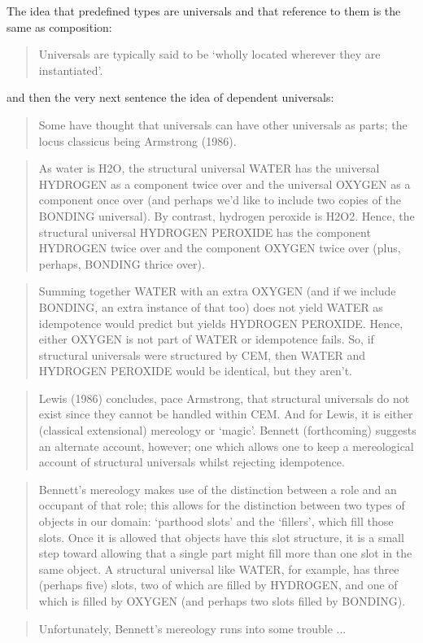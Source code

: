 \documentclass[10pt,a4paper]{scrartcl}
\begin{document}
The idea that predefined types are universals and that reference to them is the same as composition:
\begin{quote}
Universals are typically said to be ‘wholly located wherever they are instantiated’.
\end{quote}
and then the very next sentence the idea of dependent universals:
\begin{quote}
Some have thought that universals can have other universals as parts; the locus classicus being
Armstrong (1986).
\end{quote}


\begin{quote}
As water is H2O, the structural universal WATER has the universal HYDROGEN as a
component twice over and the universal OXYGEN as a component once over (and perhaps
we’d like to include two copies of the BONDING universal). By contrast, hydrogen peroxide
is H2O2. Hence, the structural universal HYDROGEN PEROXIDE has the component
HYDROGEN twice over and the component OXYGEN twice over (plus, perhaps, BONDING
thrice over).
\end{quote}
\begin{quote}
Summing together WATER with an extra OXYGEN (and if we include BONDING, an extra
instance of that too) does not yield WATER as idempotence would predict but yields
HYDROGEN PEROXIDE. Hence, either OXYGEN is not part of WATER or idempotence fails.
So, if structural universals were structured by CEM, then WATER and HYDROGEN PEROXIDE
would be identical, but they aren’t.
\end{quote}
\begin{quote}
Lewis (1986) concludes, pace Armstrong, that structural universals do not exist since they
cannot be handled within CEM. And for Lewis, it is either (classical extensional) mereology
or ‘magic’. Bennett (forthcoming) suggests an alternate account, however; one which allows
one to keep a mereological account of structural universals whilst rejecting idempotence.
\end{quote}
\begin{quote}
Bennett’s mereology makes use of the distinction between a role and an occupant of that
role; this allows for the distinction between two types of objects in our domain: ‘parthood
slots’ and the ‘fillers’, which fill those slots. Once it is allowed that objects have this slot structure, it is a small step toward allowing that a single part might fill more than one slot in the
same object. A structural universal like WATER, for example, has three (perhaps five) slots,
two of which are filled by HYDROGEN, and one of which is filled by OXYGEN (and perhaps
two slots filled by BONDING).
\end{quote}
\begin{quote}
Unfortunately, Bennett’s mereology runs into some trouble ...
\end{quote}
\end{document}
